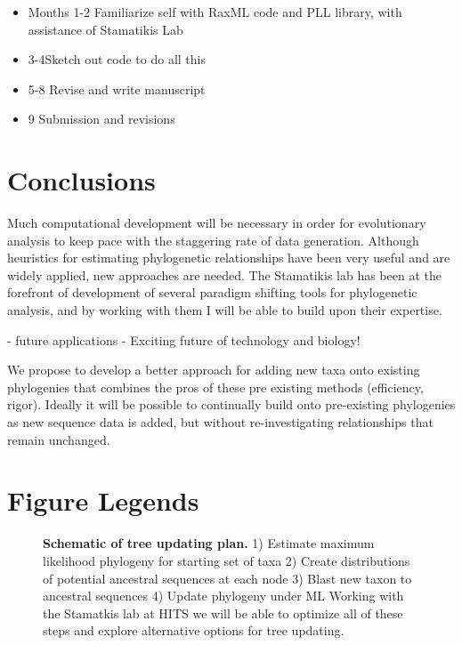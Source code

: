 \documentclass[10pt]{article}
\begin{document}
\begin{itemize}
  \item{Months 1-2} Familiarize self with RaxML code and PLL library, with assistance of Stamatikis Lab
  \item{3-4}Sketch out code to do all this 
  \item{5-8} Revise and write manuscript
  \item{9} Submission and revisions
\end{itemize}

\section*{Conclusions}
Much computational development will be necessary in order for evolutionary analysis to keep pace with the staggering rate of data generation. Although heuristics for estimating phylogenetic relationships have been very useful and are widely applied, new approaches are needed. The Stamatikis lab has been at the forefront of development of several paradigm shifting tools for phylogenetic analysis, and by working with them I will be able to build upon their expertise.


   - future applications
   - Exciting future of technology and biology!




We propose to develop a better approach for adding new taxa onto existing phylogenies that combines the pros of these pre existing methods (efficiency, rigor). Ideally it will be possible to continually build onto pre-existing phylogenies as new sequence data is added, but without re-investigating relationships that remain unchanged.



%


\section*{Figure Legends}
\begin{figure}[!ht]
\begin{center}
\end{center}
\caption{
{\bf Schematic of tree updating plan. }  1) Estimate maximum likelihood phylogeny for starting set of taxa 2) Create distributions of potential ancestral sequences at each node 3) Blast new taxon to ancestral sequences 4) Update phylogeny under ML Working with the Stamatkis lab at HITS we will be able to optimize all of these steps and explore alternative options for tree updating.
}
\label{Figure_label}
\end{figure}
\end{document}
